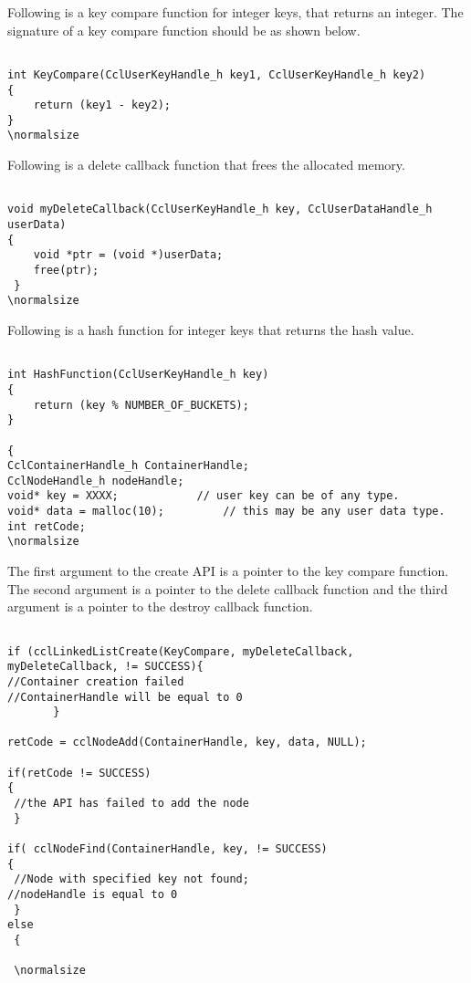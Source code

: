 \par
Following is a key compare function for integer keys, that returns an integer. The signature of a key compare function should be as shown below.

\footnotesize\begin{verbatim}

int KeyCompare(CclUserKeyHandle_h key1, CclUserKeyHandle_h key2) 
{
 	return (key1 - key2); 
}
\normalsize\end{verbatim}


Following is a delete callback function that frees the allocated memory.
\footnotesize\begin{verbatim}

void myDeleteCallback(CclUserKeyHandle_h key, CclUserDataHandle_h userData)
{
 	void *ptr = (void *)userData;
	free(ptr);
 }
\normalsize\end{verbatim}

Following is a hash function for integer keys that returns the hash value. 

\footnotesize\begin{verbatim}

int HashFunction(CclUserKeyHandle_h key)
{
 	return (key % NUMBER_OF_BUCKETS); 
}

{
CclContainerHandle_h ContainerHandle;
CclNodeHandle_h nodeHandle;
void* key = XXXX; 		 	 // user key can be of any type.
void* data = malloc(10);		 // this may be any user data type.
int retCode;
\normalsize\end{verbatim}

The first argument to the create API is a pointer to the key compare function. The second argument is a pointer to the delete callback function and
the third argument is a pointer to the destroy callback function.

\footnotesize\begin{verbatim}

if (cclLinkedListCreate(KeyCompare, myDeleteCallback, myDeleteCallback, != SUCCESS){ 
//Container creation failed 
//ContainerHandle will be equal to 0
       }

retCode = cclNodeAdd(ContainerHandle, key, data, NULL);

if(retCode != SUCCESS)
{
 //the API has failed to add the node
 }

if( cclNodeFind(ContainerHandle, key, != SUCCESS)
{
 //Node with specified key not found; 
//nodeHandle is equal to 0
 }
else
 {
 
 \normalsize\end{verbatim}

